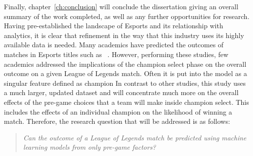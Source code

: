 Finally, chapter~\ref{ch:conclusion} will conclude the dissertation giving an overall summary of the work completed, as well as any further opportunities for research. \\


Having pre-established the landscape of Esports and its relationship with analytics, it is clear that refinement in the way that this industry uses its highly available data is needed.
Many academics have predicted the outcomes of matches in Esports titles such as ~\citet{silva2018continuous}.
However, performing these studies, few academics addressed the implications of the \gls{champion select} phase on the overall outcome on a given League of Legends match.
Often it is put into the model as a singular feature defined as champion
In contrast to other studies, this study uses a much larger, updated dataset and will concentrate much more on the overall effects of the pre-game choices that a team will make inside \gls{champion select}.
This includes the effects of an individual champion on the likelihood of winning a match.
Therefore, the research question that will be addressed is as follows:\\

\begin{quote}  \emph{Can the outcome of a League of Legends match be predicted using machine learning models from only pre-game factors?} \end{quote}